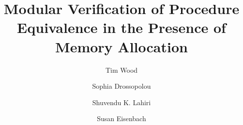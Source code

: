 \documentclass[runningheads,a4paper]{llncs}
\begin{document}
\mainmatter  %

\title{Modular Verification of Procedure Equivalence in the Presence of Memory Allocation}


%
%
\author{Tim Wood \and Sophia Drossopolou \and Shuvendu K. Lahiri \and Susan Eisenbach}
%


%
%

\maketitle

\newcommand*\symdiffequivn{e-equivalence}
\newcommand*\Symdiffequivn{E-equivalence}
\newcommand*\symdiffequiva{e-equivalent}
\newcommand*\Symdiffequiva{E-equivalent}
\newcommand*\cone{challenge~1}
\newcommand*\ctwo{challenge~2}
\newcommand*\cthree{challenge~3}
\newcommand*\cfour{challenge~4}
\newcommand*\Cone{Challenge~1}
\newcommand*\Ctwo{Challenge~2}
\newcommand*\Cthree{Challenge~3}
\newcommand*\Cfour{Challenge~4}
\newcommand*\metho{RIE}
\newcommand*\tool{APE}
\newcommand*\Tool{APE}
\end{document}
